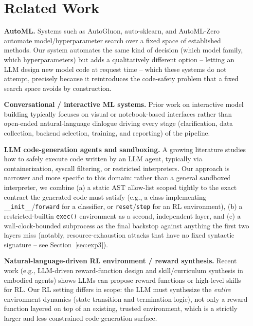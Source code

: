 \documentclass[10pt,twocolumn]{article}
\begin{document}
\section{Related Work}
\label{sec:related}

\textbf{AutoML.} Systems such as AutoGluon, auto-sklearn, and AutoML-Zero
automate model/hyperparameter search over a fixed space of established
methods. Our system automates the same kind of decision (which model family,
which hyperparameters) but adds a qualitatively different option -- letting
an LLM design new model code at request time -- which these systems do not
attempt, precisely because it reintroduces the code-safety problem that a
fixed search space avoids by construction.

\textbf{Conversational / interactive ML systems.} Prior work on interactive
model building typically focuses on visual or notebook-based interfaces
rather than open-ended natural-language dialogue driving every stage
(clarification, data collection, backend selection, training, and reporting)
of the pipeline.

\textbf{LLM code-generation agents and sandboxing.} A growing literature
studies how to safely execute code written by an LLM agent, typically via
containerization, syscall filtering, or restricted interpreters. Our
approach is narrower and more specific to this domain: rather than a general
sandboxed interpreter, we combine (a) a static AST allow-list scoped tightly
to the exact contract the generated code must satisfy (e.g., a class
implementing \texttt{\_\_init\_\_}/\texttt{forward} for a classifier, or
\texttt{reset}/\texttt{step} for an RL environment), (b) a restricted-builtin
\texttt{exec()} environment as a second, independent layer, and (c) a
wall-clock-bounded subprocess as the final backstop against anything the
first two layers miss (notably, resource-exhaustion attacks that have no
fixed syntactic signature -- see Section~\ref{sec:exp3}).

\textbf{Natural-language-driven RL environment / reward synthesis.} Recent
work (e.g., LLM-driven reward-function design and skill/curriculum
synthesis in embodied agents) shows LLMs can propose reward functions or
high-level skills for RL. Our RL setting differs in scope: the LLM must
synthesize the \emph{entire} environment dynamics (state transition and
termination logic), not only a reward function layered on top of an
existing, trusted environment, which is a strictly larger and less
constrained code-generation surface.
\end{document}

